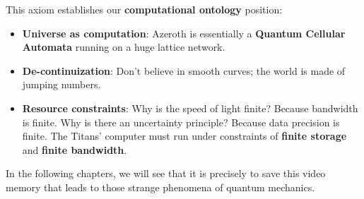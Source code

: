 This axiom establishes our \textbf{computational ontology} position:

\begin{itemize}
\item \textbf{Universe as computation}: Azeroth is essentially a \textbf{Quantum Cellular Automata} running on a huge lattice network.
\item \textbf{De-continuization}: Don't believe in smooth curves; the world is made of jumping numbers.
\item \textbf{Resource constraints}: Why is the speed of light finite? Because bandwidth is finite. Why is there an uncertainty principle? Because data precision is finite. The Titans' computer must run under constraints of \textbf{finite storage} and \textbf{finite bandwidth}.
\end{itemize}

In the following chapters, we will see that it is precisely to save this video memory that leads to those strange phenomena of quantum mechanics.

